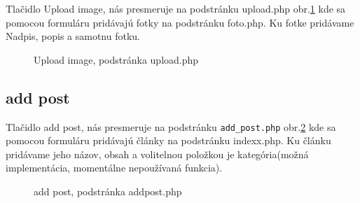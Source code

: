 Tlačidlo Upload image, nás presmeruje na podstránku upload.php obr.\ref{OBRAZOK 1.10} kde sa pomocou formuláru pridávajú fotky na podstránku foto.php. Ku fotke pridávame Nadpis, popis a samotnu fotku.

\begin{figure}[!tbh]
\centering
\setlength{\fboxsep}{0pt}%
\setlength{\fboxrule}{1pt}%
\caption{Upload image, podstránka upload.php }\label{OBRAZOK 1.10}
\end{figure} 

\subsection{add post}

Tlačidlo add post, nás presmeruje na podstránku \verb|add_post.php| obr.\ref{OBRAZOK 1.11} kde sa pomocou formuláru pridávajú články na podstránku indexx.php. Ku článku pridávame jeho názov, obsah a volitelnou položkou je kategória(možná implementácia, momentálne nepoužívaná funkcia).

\begin{figure}[!tbh]
\centering
\setlength{\fboxsep}{0pt}%
\setlength{\fboxrule}{1pt}%
\caption{add post, podstránka addpost.php}\label{OBRAZOK 1.11}
\end{figure} 

